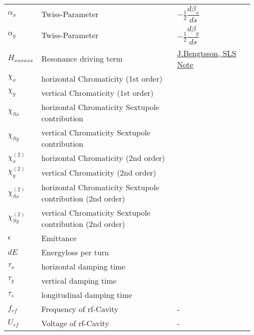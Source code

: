 \documentclass[a4paper,11pt]{article}
\begin{document}
\begin{tabular}{lllp{6cm}}
$\alpha_x$ & Twiss-Parameter  & $-\frac{1}{2} \dfrac{d\beta_x}{ds}$ \\
$\alpha_y$ & Twiss-Parameter  & $-\frac{1}{2} \dfrac{d\beta_y}{ds}$ \\
$H_{xxxxxx}$& Resonance driving term  & \href{https://www.google.com/url?sa=t&source=web&rct=j&opi=89978449&url=https://ados.web.psi.ch/slsnotes/sls0997.pdf&ved=2ahUKEwiI3-fOv6eNAxW3B9sEHRLcBioQFnoECB4QAQ&usg=AOvVaw0NnjGwBXIiqzxUtzqDQFbW}{J.Bengtsson, SLS Note} \\
$\chi_x$& horizontal Chromaticity (1st order) & \\
$\chi_y$& vertical Chromaticity (1st order) & \\
$\chi_{Sx}$& horizontal Chromaticity Sextupole contribution & \\
$\chi_{Sy}$& vertical Chromaticity Sextupole contribution & \\
$\chi^{(2)}_{x}$& horizontal Chromaticity (2nd order) & \\
$\chi^{(2)}_{y}$& vertical Chromaticity (2nd order)& \\
$\chi^{(2)}_{Sx}$& horizontal Chromaticity Sextupole contribution (2nd order)& \\
$\chi^{(2)}_{Sy}$& vertical Chromaticity Sextupole contribution (2nd order)& \\
$\epsilon$ & Emittance & \\
$dE$& Energyloss per turn &\\
$\tau_x$ & horizontal damping time & \\
$\tau_y$ & vertical damping time & \\
$\tau_s$ & longitudinal damping time & \\



$f_{rf}$&Frequency of rf-Cavity&- \\
$U_{rf}$&Voltage of rf-Cavity&- \\
\bottomrule
\end{tabular}
\end{document}
